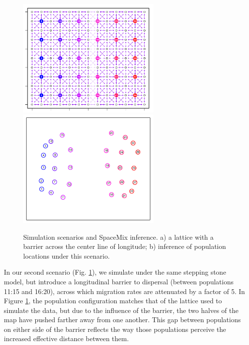 \documentclass[12pt]{article}
\begin{document}
\begin{figure}
	\centering
			{\includegraphics[width=2.8in,height=2.33in]{figs/sims/barrier_lattice.png}}
			{\includegraphics[width=2.8in,height=2.33in]{figs/sims/GeoGenMap_barrier.pdf}}
	\caption{Simulation scenarios and SpaceMix inference.  a) a lattice with a barrier across the center line of longitude; b) inference of population locations under this scenario.}\label{sfig:barrier_scenarios}
\end{figure}

In our second scenario (Fig. \ref{sfig:barrier_scenarios}), we simulate under the same stepping stone model, but introduce a longitudinal barrier to dispersal (between populations 11:15 and 16:20), across which migration rates are attenuated by a factor of 5.  In Figure \ref{sfig:barrier_scenarios}, the population configuration matches that of the lattice used to simulate the data, but due to the influence of the barrier, the two halves of the map have pushed farther away from one another.  This gap between populations on either side of the barrier reflects the way those populations perceive the increased effective distance between them.
\end{document}
